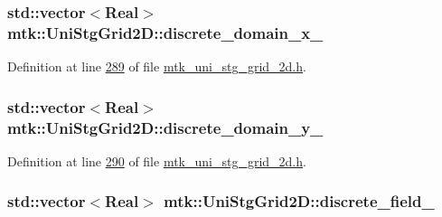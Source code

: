 \hypertarget{classmtk_1_1UniStgGrid2D_ab15979865852583a46662ea592f27a4f}{
\subsubsection[{discrete\+\_\+domain\+\_\+x\+\_\+}]{\setlength{\rightskip}{0pt plus 5cm}std\+::vector$<${\bf Real}$>$ mtk\+::\+Uni\+Stg\+Grid2\+D\+::discrete\+\_\+domain\+\_\+x\+\_\+\hspace{0.3cm}{\ttfamily [private]}}}\label{classmtk_1_1UniStgGrid2D_ab15979865852583a46662ea592f27a4f}


Definition at line \hyperlink{mtk__uni__stg__grid__2d_8h_source_l00289}{289} of file \hyperlink{mtk__uni__stg__grid__2d_8h_source}{mtk\+\_\+uni\+\_\+stg\+\_\+grid\+\_\+2d.\+h}.

\hypertarget{classmtk_1_1UniStgGrid2D_ad69f93d4b27707d97f209b907383a7a2}{
\subsubsection[{discrete\+\_\+domain\+\_\+y\+\_\+}]{\setlength{\rightskip}{0pt plus 5cm}std\+::vector$<${\bf Real}$>$ mtk\+::\+Uni\+Stg\+Grid2\+D\+::discrete\+\_\+domain\+\_\+y\+\_\+\hspace{0.3cm}{\ttfamily [private]}}}\label{classmtk_1_1UniStgGrid2D_ad69f93d4b27707d97f209b907383a7a2}


Definition at line \hyperlink{mtk__uni__stg__grid__2d_8h_source_l00290}{290} of file \hyperlink{mtk__uni__stg__grid__2d_8h_source}{mtk\+\_\+uni\+\_\+stg\+\_\+grid\+\_\+2d.\+h}.

\hypertarget{classmtk_1_1UniStgGrid2D_ad7474b2669ee988b84aed20b7f5dc7be}{
\subsubsection[{discrete\+\_\+field\+\_\+}]{\setlength{\rightskip}{0pt plus 5cm}std\+::vector$<${\bf Real}$>$ mtk\+::\+Uni\+Stg\+Grid2\+D\+::discrete\+\_\+field\+\_\+\hspace{0.3cm}{\ttfamily [private]}}}\label{classmtk_1_1UniStgGrid2D_ad7474b2669ee988b84aed20b7f5dc7be}


